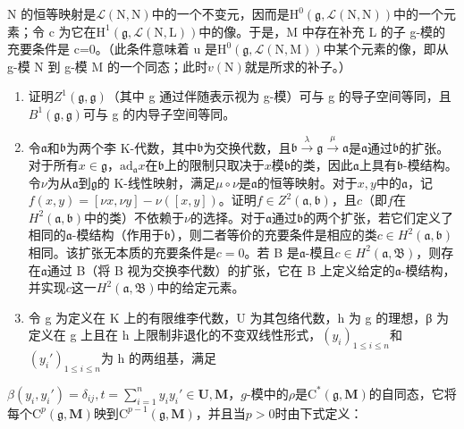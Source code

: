  N 的恒等映射是\(\mathcal{L}(\mathrm{N},\mathrm{N})\)中的一个不变元，因而是\(\mathrm{H}^{0}(\mathfrak{g},\mathcal{L}(\mathrm{N},\mathrm{N}))\)中的一个元素；令 c 为它在\(\mathrm{H}^{1}(\mathfrak{g},\mathcal{L}(\mathrm{N},\mathrm{L}))\)中的像。于是，M 中存在补充 L 的子 g-模的充要条件是 c=0。（此条件意味着 u 是\(\mathrm{H}^{0}(\mathfrak{g},\mathcal{L}(\mathrm{N},\mathrm{M}))\)中某个元素的像，即从 g-模 N 到 g-模 M 的一个同态；此时\(v(\mathrm{N})\)就是所求的补子。）

\begin{enumerate}
\def\labelenumi{(\alph{enumi})}
\setcounter{enumi}{7}
\item
  证明\(Z^{1}(\mathfrak{g},\mathfrak{g})\)（其中 g 通过伴随表示视为 g-模）可与 g 的导子空间等同，且\(B^{1}(\mathfrak{g},\mathfrak{g})\)可与 g 的内导子空间等同。
\item
  令\(\mathfrak{a}\)和\(\mathfrak{b}\)为两个李 K-代数，其中\(\mathfrak{b}\)为交换代数，且\(\mathfrak{b} \xrightarrow{\lambda} \mathfrak{g} \xrightarrow{\mu} \mathfrak{a}\)是\(\mathfrak{a}\)通过\(\mathfrak{b}\)的扩张。对于所有\(x \in \mathfrak{g}\)，\(\mathrm{ad}_{\mathfrak{a}} x\)在\(\mathfrak{b}\)上的限制只取决于\(x\)模\(\mathfrak{b}\)的类，因此\(\mathfrak{a}\)上具有\(\mathfrak{b}\)-模结构。令\(\nu\)为从\(\mathfrak{a}\)到\(\mathfrak{g}\)的 K-线性映射，满足\(\mu \circ \nu\)是\(\mathfrak{a}\)的恒等映射。对于\(x, y\)中的\(\mathfrak{a}\)，记\(f(x, y) = [\nu x, \nu y] - \nu([x, y])\)。证明\(f \in Z^2(\mathfrak{a}, \mathfrak{b})\)，且\(c\)（即\(f\)在\(H^2(\mathfrak{a}, \mathfrak{b})\)中的类）不依赖于\(\nu\)的选择。对于\(\mathfrak{a}\)通过\(\mathfrak{b}\)的两个扩张，若它们定义了相同的\(\mathfrak{a}\)-模结构（作用于\(\mathfrak{b}\)），则二者等价的充要条件是相应的类\(c \in H^2(\mathfrak{a}, \mathfrak{b})\)相同。该扩张无本质的充要条件是\(c = 0\)。若 B 是\(\mathfrak{a}\)-模且\(c \in H^2(\mathfrak{a}, \mathfrak{B})\)，则存在\(\mathfrak{a}\)通过 B（将 B 视为交换李代数）的扩张，它在 B 上定义给定的\(\mathfrak{a}\)-模结构，并实现\(c\)这一\(H^2(\mathfrak{a}, \mathfrak{B})\)中的给定元素。
\item
  令 g 为定义在 K 上的有限维李代数，U 为其包络代数，h 为 g 的理想，β 为定义在 g 上且在 h 上限制非退化的不变双线性形式，\((y_{i})_{1 \leqslant i \leqslant n}\)和\((y_{i}')_{1 \leqslant i \leqslant n}\)为 h 的两组基，满足
\end{enumerate}

 \(\beta(y_i, y_i') = \delta_{ij}, t = \sum_{i=1}^{n} y_i y_i' \in \mathbf{U}, \mathbf{M}\)，\(g\)-模中的\(\rho\)是\(\mathrm{C}^*(\mathfrak{g}, \mathbf{M})\)的自同态，它将每个\(\mathrm{C}^p(\mathfrak{g}, \mathbf{M})\)映到\(\mathrm{C}^{p-1}(\mathfrak{g}, \mathbf{M})\)，并且当\(p > 0\)时由下式定义：

